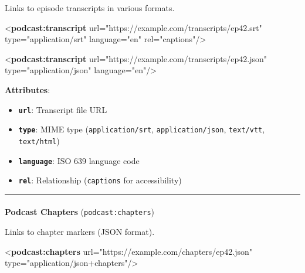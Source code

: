\documentclass[
  letterpaper,
  DIV=11,
  numbers=noendperiod]{scrartcl}
\makeatletter
\let\oldparagraph\paragraph
\renewcommand{\paragraph}{
    \@ifstar
      \xxxParagraphStar
      \xxxParagraphNoStar
  }
\newcommand{\xxxParagraphStar}[1]{\oldparagraph*{#1}\mbox{}}
\newcommand{\xxxParagraphNoStar}[1]{\oldparagraph{#1}\mbox{}}
\newenvironment{Shaded}{\begin{snugshade}}{\end{snugshade}}
\newcommand{\KeywordTok}[1]{\textcolor[rgb]{0.00,0.23,0.31}{\textbf{#1}}}
\newcommand{\NormalTok}[1]{\textcolor[rgb]{0.00,0.23,0.31}{#1}}
\newcommand{\OtherTok}[1]{\textcolor[rgb]{0.00,0.23,0.31}{#1}}
\newcommand{\StringTok}[1]{\textcolor[rgb]{0.13,0.47,0.30}{#1}}
\providecommand{\tightlist}{%
  \setlength{\itemsep}{0pt}\setlength{\parskip}{0pt}}\usepackage{longtable,booktabs,array}
\makeatother
\begin{document}
Links to episode transcripts in various formats.

\begin{Shaded}
\begin{Highlighting}[]
\NormalTok{\textless{}}\KeywordTok{podcast:transcript} 
\OtherTok{    url=}\StringTok{"https://example.com/transcripts/ep42.srt"} 
\OtherTok{    type=}\StringTok{"application/srt"} 
\OtherTok{    language=}\StringTok{"en"} 
\OtherTok{    rel=}\StringTok{"captions"}\NormalTok{/\textgreater{}}

\NormalTok{\textless{}}\KeywordTok{podcast:transcript} 
\OtherTok{ url=}\StringTok{"https://example.com/transcripts/ep42.json"} 
\OtherTok{    type=}\StringTok{"application/json"} 
\OtherTok{    language=}\StringTok{"en"}\NormalTok{/\textgreater{}}
\end{Highlighting}
\end{Shaded}

\textbf{Attributes}:

\begin{itemize}
\tightlist
\item
  \textbf{\texttt{url}}: Transcript file URL
\item
  \textbf{\texttt{type}}: MIME type (\texttt{application/srt},
  \texttt{application/json}, \texttt{text/vtt}, \texttt{text/html})
\item
  \textbf{\texttt{language}}: ISO 639 language code
\item
  \textbf{\texttt{rel}}: Relationship (\texttt{captions} for
  accessibility)
\end{itemize}

\begin{center}\rule{0.5\linewidth}{0.5pt}\end{center}

\paragraph{\texorpdfstring{\textbf{Podcast Chapters}
(\texttt{podcast:chapters})}{Podcast Chapters (podcast:chapters)}}\label{podcast-chapters-podcastchapters}

Links to chapter markers (JSON format).

\begin{Shaded}
\begin{Highlighting}[]
\NormalTok{\textless{}}\KeywordTok{podcast:chapters} 
\OtherTok{    url=}\StringTok{"https://example.com/chapters/ep42.json"} 
\OtherTok{    type=}\StringTok{"application/json+chapters"}\NormalTok{/\textgreater{}}
\end{Highlighting}
\end{Shaded}
\end{document}
